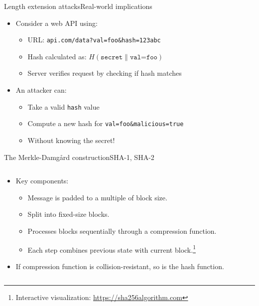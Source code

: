 \documentclass[aspectratio=169, lualatex, handout]{beamer}
\begin{document}
\begin{frame}{Length extension attacks}{Real-world implications}
	\begin{itemize}
		\item Consider a web API using:
		      \begin{itemize}
			      \item URL: \texttt{api.com/data?val=foo\&hash=123abc}
			      \item Hash calculated as: $H(\texttt{secret} \| \texttt{val=foo})$
			      \item Server verifies request by checking if hash matches
		      \end{itemize}
		\item An attacker can:
		      \begin{itemize}
			      \item Take a valid \texttt{hash} value
			      \item Compute a new hash for \texttt{val=foo\&malicious=true}
			      \item Without knowing the secret!
		      \end{itemize}
	\end{itemize}
\end{frame}

\begin{frame}{The Merkle-Damg\aa rd construction}{SHA-1, SHA-2}
	\begin{columns}[c]
		\begin{column}{0.5\textwidth}
			\begin{itemize}
				\item Key components:
				      \begin{itemize}
					      \item Message is padded to a multiple of block size.
					      \item Split into fixed-size blocks.
					      \item Processes blocks sequentially through a compression function.
					      \item Each step combines previous state with current block.\footnote{Interactive visualization: \url{https://sha256algorithm.com}}
				      \end{itemize}
				\item If compression function is collision-resistant, so is the hash function.
			\end{itemize}
		\end{column}
		\begin{column}{0.5\textwidth}
		\end{column}
	\end{columns}
\end{frame}
\end{document}
